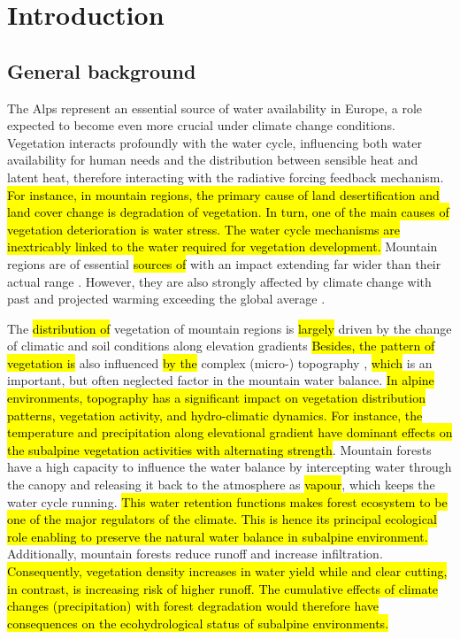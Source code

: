 \documentclass[10pt,letterpaper]{article}
\begin{document}
\linenumbers

\section{Introduction}

\subsection{General background}
The Alps represent an essential source of water availability in Europe, a role expected to become even more crucial under climate change conditions. Vegetation interacts profoundly with the water cycle, influencing both water availability for human needs and the distribution between sensible heat and latent heat, therefore interacting with the radiative forcing feedback mechanism. \hl{For instance, in mountain regions, the primary cause of land desertification and land cover change is degradation of vegetation. In turn, one of the main causes of vegetation deterioration is water stress. The water cycle mechanisms are inextricably linked to the water required for vegetation development. }Mountain regions are of essential \hl{sources of} with an impact extending far wider than their actual range \cite{Messerli,Viviroli,BENISTON2011734}. However, they are also strongly affected by climate change with past and projected warming exceeding the global average \cite{Beniston,GOBIET20141138}. 

The \hl{distribution of }vegetation of mountain regions is \hl{largely }driven by the change of climatic and soil conditions along elevation gradients \cite{Nagy,Grabherr}\hl{Besides, the pattern of vegetation is }also influenced \hl{by the }complex (micro-) topography \cite{Koerner}, \hl{which }is an important, but often neglected factor in the mountain water balance. \hl{In alpine environments, topography has a significant impact on vegetation distribution patterns, vegetation activity, and hydro-climatic dynamics. For instance, the temperature and precipitation along elevational gradient have dominant effects on the subalpine vegetation activities with alternating strength}. Mountain forests have a high capacity to influence the water balance by intercepting water through the canopy and releasing it back to the atmosphere as \hl{vapour}, which keeps the water cycle running. \hl{This water retention functions makes forest ecosystem to be one of the major regulators of the climate. This is hence its principal ecological role enabling to preserve the natural water balance in subalpine environment. }Additionally, mountain forests reduce runoff and increase infiltration. \hl{Consequently, vegetation density increases in water yield while  and clear cutting, in contrast, is increasing risk of higher runoff. The cumulative effects of climate changes (precipitation) with forest degradation would therefore have consequences on the ecohydrological status of subalpine environments.}
\end{document}
